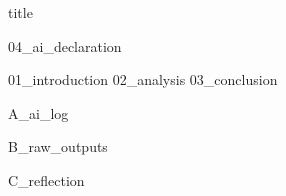 \documentclass{article}
\begin{document}
{title}

\frontmatter

{04_ai_declaration}
\newpage

\tableofcontents

\listoffigures
\listoftables

\mainmatter

{01_introduction}
{02_analysis}
{03_conclusion}

\newpage
\printbibliography[heading = bibintoc, title = References]    %

\addappendix
{A_ai_log}

\newpage
{B_raw_outputs}

\newpage
{C_reflection}



\end{document}
